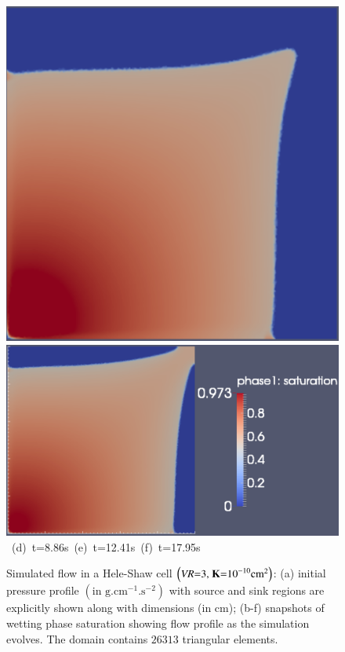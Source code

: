 \begin{landscape}
\begin{figure}[ht]
{{      \includegraphics[width=.38\textwidth]{./Pics1/Saffman_homogeneous_MR3/saffman_homo_fixed_3500.pdf} 
      \includegraphics[width=.66\textwidth]{./Pics1/Saffman_homogeneous_MR3/saffman_homo_fixed_end.pdf}}
\vspace{0.cm}
\hbox{ \hspace{1.cm} (d) t=8.86s \hspace{3.0cm} (e) t=12.41s   \hspace{4.0cm} (f) t=17.95s}
\vspace{0.cm}
}   
\caption{Simulated flow in a Hele-Shaw cell $\left(\text{{\it VR}=3, {\bf K}=10}^{-10}\text{cm}^{2}\right)$: (a) initial pressure profile $\left(\text{in g.cm}^{-1}\text{.s}^{-2}\right)$ with source and sink regions are explicitly shown along with dimensions (in cm); (b-f) snapshots of wetting phase saturation showing flow profile as the simulation evolves. The domain contains $26313$  triangular elements.}
\label{fig:homoheleshaw_VN3}
\end{figure}
\end{landscape}
\clearpage



